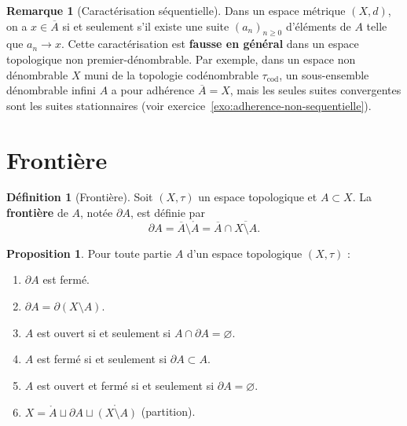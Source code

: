 \documentclass[12pt,a4paper,openany]{book}
\theoremstyle{definition}
\newtheorem{definition}{Définition}[chapter]
\theoremstyle{cours}
\newtheorem{proposition}[theoreme]{Proposition}
\theoremstyle{coursnormal}
\newtheorem{remarque}[theoreme]{Remarque}
\newcommand{\Int}[1]{\mathring{#1}}
\newcommand{\Cl}[1]{\overline{#1}}
\newcommand{\Fr}[1]{\partial #1}
\begin{document}
\begin{remarque}[Caractérisation séquentielle]\label{rem:carac-sequentielle}
  Dans un espace métrique $(X,d)$, on a $x \in \Cl{A}$ si et seulement s'il existe une suite $(a_n)_{n \geq 0}$ d'éléments de $A$ telle que $a_n \to x$. Cette caractérisation est \textbf{fausse en général} dans un espace topologique non premier-dénombrable. Par exemple, dans un espace non dénombrable $X$ muni de la topologie codénombrable $\tau_{\mathrm{cod}}$, un sous-ensemble dénombrable infini $A$ a pour adhérence $\Cl{A} = X$, mais les seules suites convergentes sont les suites stationnaires (voir exercice~\ref{exo:adherence-non-sequentielle}).
\end{remarque}

\section{Frontière}
\label{sec:frontiere}

\begin{definition}[Frontière]\label{def:frontiere}
  Soit $(X,\tau)$ un espace topologique et $A \subset X$. La \textbf{frontière} de $A$, notée $\Fr{A}$, est définie par
  \[
    \Fr{A} = \Cl{A} \setminus \Int{A} = \Cl{A} \cap \Cl{X \setminus A}.
  \]
\end{definition}

\begin{proposition}\label{prop:proprietes-frontiere}
  Pour toute partie $A$ d'un espace topologique $(X,\tau)$ :
  \begin{enumerate}[label=(\roman*)]
    \item $\Fr{A}$ est fermé.
    \item $\Fr{A} = \Fr{(X \setminus A)}$.
    \item $A$ est ouvert si et seulement si $A \cap \Fr{A} = \varnothing$.
    \item $A$ est fermé si et seulement si $\Fr{A} \subset A$.
    \item $A$ est ouvert et fermé si et seulement si $\Fr{A} = \varnothing$.
    \item $X = \Int{A} \sqcup \Fr{A} \sqcup \Int{(X \setminus A)}$ (partition).
  \end{enumerate}
\end{proposition}
\end{document}
